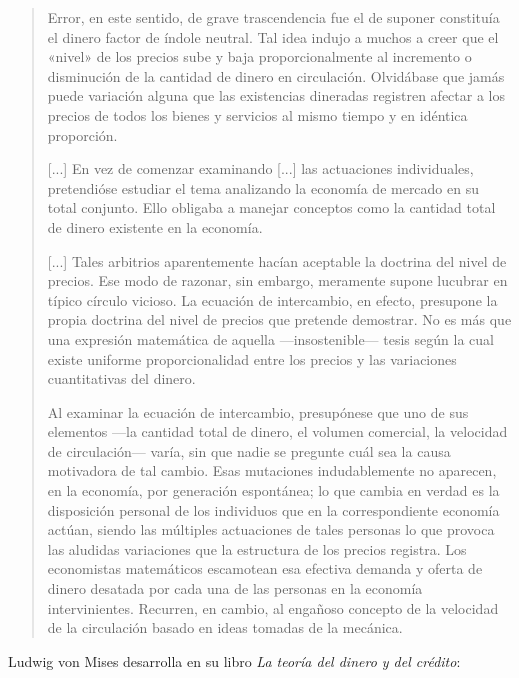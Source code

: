\documentclass[12pt,a4paper,twoside]{book}
\begin{document}
\begin{quotation}
Error, en este sentido, de grave trascendencia fue el de suponer constituía el dinero factor de índole neutral. Tal idea indujo a muchos a creer que el «nivel» de los precios sube y baja proporcionalmente al incremento o disminución de la cantidad de dinero en circulación. Olvidábase que jamás puede variación alguna que las existencias dineradas registren afectar a los precios de todos los bienes y servicios al mismo tiempo y en idéntica proporción. 

[...] En vez de comenzar examinando [...] las actuaciones individuales, pretendióse estudiar el tema analizando la economía de mercado en su total conjunto. Ello obligaba a manejar conceptos como la cantidad total de dinero existente en la economía.

[...] Tales arbitrios aparentemente hacían aceptable la doctrina del nivel de precios. Ese modo de razonar, sin embargo, meramente supone lucubrar en típico círculo vicioso. La ecuación de intercambio, en efecto, presupone la propia doctrina del nivel de precios que pretende demostrar. No es más que una expresión matemática de aquella —insostenible— tesis según la cual existe uniforme proporcionalidad entre los precios y las variaciones cuantitativas del dinero.

Al examinar la ecuación de intercambio, presupónese que uno de sus elementos —la cantidad total de dinero, el volumen comercial, la velocidad de circulación— varía, sin que nadie se pregunte cuál sea la causa motivadora de tal cambio. Esas mutaciones indudablemente no aparecen, en la economía, por generación espontánea; lo que cambia en verdad es la disposición personal de los individuos que en la correspondiente economía actúan, siendo las múltiples actuaciones de tales personas lo que provoca las aludidas variaciones que la estructura de los precios registra. Los economistas matemáticos escamotean esa efectiva demanda y oferta de dinero desatada por cada una de las personas en la economía intervinientes. Recurren, en cambio, al engañoso concepto de la velocidad de la circulación basado en ideas tomadas de la mecánica. \cite{krause:teomon}
\end{quotation}

Ludwig von Mises desarrolla en su libro \textit{La teoría del dinero y del crédito}:
\end{document}
